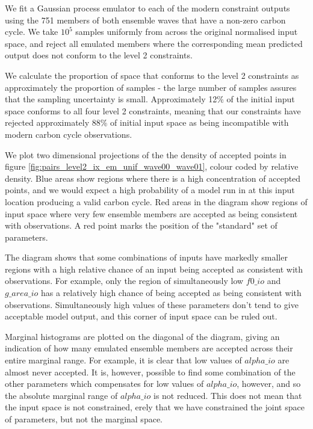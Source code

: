 \documentclass[gmd, manuscript]{copernicus}
\begin{document}
We fit a Gaussian process emulator to each of the modern constraint outputs using the 751 members of both ensemble waves that have a non-zero carbon cycle. We take $10^{5}$ samples uniformly from across the original normalised input space, and reject all emulated members where the corresponding mean predicted output does not conform to the level 2 constraints.

We calculate the proportion of space that conforms to the level 2 constraints as approximately the proportion of samples - the large number of samples assures that the sampling uncertainty is small. Approximately 12\% of the initial input space conforms to all four level 2 constraints, meaning that our constraints have rejected approximately 88\% of initial input space as being incompatible with modern carbon cycle observations.

We plot two dimensional projections of the the density of accepted points in figure \ref{fig:pairs_level2_ix_em_unif_wave00_wave01}, colour coded by relative density. Blue areas show regions where there is a high concentration of accepted points, and we would expect a high probability of a model run in at this input location producing a valid carbon cycle. Red areas in the diagram show regions of input space where very few ensemble members are accepted as being consistent with observations. A red point marks the position of the "standard" set of parameters.

The diagram shows that some combinations of inputs have markedly smaller regions with a high relative chance of an input being accepted as consistent with observations. For example, only the region of simultaneously low $f0\_io$ and $g\_area\_io$ has a relatively high chance of being accepted as being consistent with observations. Simultaneously high values of these parameters don't tend to give acceptable model output, and this corner of input space can be ruled out.

Marginal histograms are plotted on the diagonal of the diagram, giving an indication of how many emulated ensemble members are accepted across their entire marginal range. For example, it is clear that low values of $alpha\_io$ are almost never accepted. It is, however, possible to find some combination of the other parameters which compensates for low values of $alpha\_io$, however, and so the absolute marginal range of $alpha\_io$ is not reduced. This does not mean that the input space is not constrained, erely that we have constrained the joint space of parameters, but not the marginal space.
\end{document}
